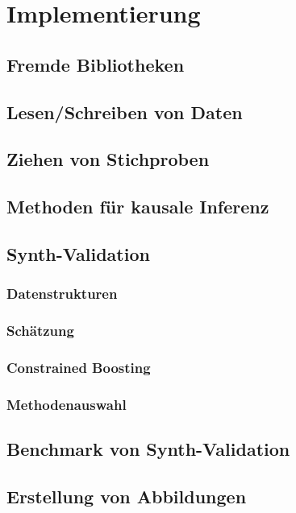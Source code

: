 \documentclass[12pt,a4paper,twoside]{scrartcl}
\numberwithin{equation}{section}
\begin{document}
\section{Implementierung}\label{sec:implementierung}
	\subsection{Fremde Bibliotheken}\label{subsec:fremdeBibliotheken}
  	\subsection{Lesen/Schreiben von Daten}\label{subsec:lesenSchreibenDaten}
  	\subsection{Ziehen von Stichproben}\label{subsec:ziehenStichproben}
  	\subsection{Methoden für kausale Inferenz}\label{subsec:methodenKausaleInferenz}
  	\subsection{Synth-Validation}\label{subsec:synthValidation}
  		\subsubsection{Datenstrukturen}\label{subsubsec:datenstrukturen}
  		\subsubsection{Schätzung}\label{subsubsec:schätung}
  		\subsubsection{Constrained Boosting}\label{subsubsec:constrainedBoosting}
  		\subsubsection{Methodenauswahl}\label{subsubsec:methodenauswahl}
  	\subsection{Benchmark von Synth-Validation}\label{subsec:benchmarkSynthValidation}
  	\subsection{Erstellung von Abbildungen}\label{subsec:erstellungAbbildungen}
\end{document}
